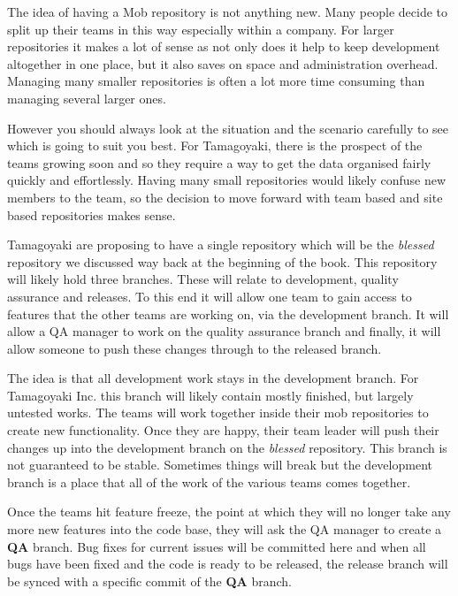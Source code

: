 The idea of having a Mob repository is not anything new.  Many people decide to split up their teams in this way especially within a company.  For larger repositories it makes a lot of sense as not only does it help to keep development altogether in one place, but it also saves on space and administration overhead.  Managing many smaller repositories is often a lot more time consuming than managing several larger ones.  

However you should always look at the situation and the scenario carefully to see which is going to suit you best.  For Tamagoyaki, there is the prospect of the teams growing soon and so they require a way to get the data organised fairly quickly and effortlessly.  Having many small repositories would likely confuse new members to the team, so the decision to move forward with team based and site based repositories makes sense.

Tamagoyaki are proposing to have a single repository which will be the \emph{blessed} repository we discussed way back at the beginning of the book.  This repository will likely hold three branches.  These will relate to development, quality assurance and releases.  To this end it will allow one team to gain access to features that the other teams are working on, via the development branch.  It will allow a QA manager to work on the quality assurance branch and finally, it will allow someone to push these changes through to the released branch.  

The idea is that all development work stays in the development branch.  For Tamagoyaki Inc. this branch will likely contain mostly finished, but largely untested works.  The teams will work together inside their mob repositories to create new functionality.  Once they are happy, their team leader will push their changes up into the development branch on the \emph{blessed} repository.  This branch is not guaranteed to be stable.  Sometimes things will break but the development branch is a place that all of the work of the various teams comes together.  

Once the teams hit feature freeze, the point at which they will no longer take any more new features into the code base, they will ask the QA manager to create a \textbf{QA} branch.  Bug fixes for current issues will be committed here and when all bugs have been fixed and the code is ready to be released, the release branch will be synced with a specific commit of the \textbf{QA} branch.  

